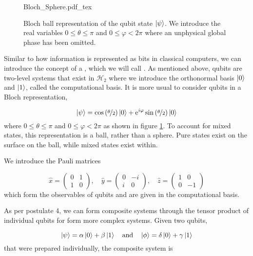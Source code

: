 \begin{figure}
	\centering
	\def\svgwidth{0.5\textwidth}
   	{Bloch_Sphere.pdf_tex}
   	\caption[Bloch ball representation of a qubit]{Bloch ball representation of the qubit state $\ket{\psi}$. We introduce the real variables $0\le\theta\le\pi$ and $0\le\varphi<2\pi$ where an unphysical global phase has been omitted.}
   	\label{fig:bloch}
\end{figure}

Similar to how information is represented as bits in classical computers, we can introduce the concept of a , which we will call . As mentioned above, qubits are two-level systems that exist in $\mathcal{H}_2$ where we introduce the orthonormal basis $\ket{0}$ and $\ket{1}$, called the computational basis. It is more usual to consider qubits in a Bloch representation,

\begin{equation}
	\ket{\psi} = \cos\left(\nicefrac{\theta}{2}\right)\ket{0} + \mathrm{e}^{i\varphi}\sin\left(\nicefrac{\theta}{2}\right)\ket{0}
\end{equation}
where $0\le\theta\le\pi$ and $0\le\varphi<2\pi$ as shown in figure \ref{fig:bloch}. To account for mixed states, this representation is a ball, rather than a sphere. Pure states exist on the surface on the ball, while mixed states exist within.

We introduce the Pauli matrices

\begin{equation}
	\hat{x} = \left(\begin{matrix}
		0 & 1 \\
		1 & 0
	\end{matrix}\right),
	\quad
	\hat{y} = \left(\begin{matrix}
		0 & -i \\
		i & 0
	\end{matrix}\right),
	\quad
	\hat{z} = \left(\begin{matrix}
		1 & 0 \\
		0 & -1
	\end{matrix}\right)
\end{equation}
which form the observables of qubits and are given in the computational basis. 

As per postulate 4, we can form composite systems through the tensor product of individual qubits for form more complex systems. Given two qubits,

\begin{equation}
	\ket{\psi} = \alpha\ket{0} + \beta\ket{1} \quad \text{and} \quad \ket{\phi} = \delta\ket{0} + \gamma\ket{1}
\end{equation} 
that were prepared individually, the composite system is

